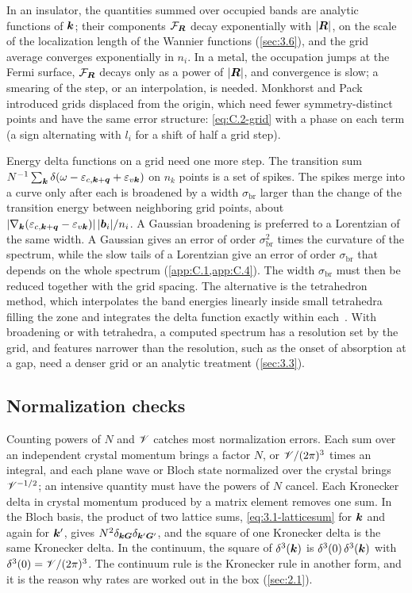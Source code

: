In an insulator, the quantities summed over occupied bands are analytic functions of $\bm{k}$; their components $\mathcal{F}_{\bm{R}}$ decay exponentially with $|\bm{R}|$, on the scale of the localization length of the Wannier functions (\cref{sec:3.6}), and the grid average converges exponentially in $n_i$. In a metal, the occupation jumps at the Fermi surface, $\mathcal{F}_{\bm{R}}$ decays only as a power of $|\bm{R}|$, and convergence is slow; a smearing of the step, or an interpolation, is needed. Monkhorst and Pack~\cite{monkhorst1976special} introduced grids displaced from the origin, which need fewer symmetry-distinct points and have the same error structure: \cref{eq:C.2-grid} with a phase on each term (a sign alternating with $l_i$ for a shift of half a grid step).

Energy delta functions on a grid need one more step. The transition sum $N^{-1}\sum_{\bm{k}}\delta(\omega - \varepsilon_{c,\bm{k}+\bm{q}} + \varepsilon_{v\bm{k}})$ on $n_k$ points is a set of spikes. The spikes merge into a curve only after each is broadened by a width $\sigma_{\mathrm{br}}$ larger than the change of the transition energy between neighboring grid points, about $|\nabla_{\bm{k}}(\varepsilon_{c,\bm{k}+\bm{q}} - \varepsilon_{v\bm{k}})|\,|\bm{b}_i|/n_i$. A Gaussian broadening is preferred to a Lorentzian of the same width. A Gaussian gives an error of order $\sigma_{\mathrm{br}}^2$ times the curvature of the spectrum, while the slow tails of a Lorentzian give an error of order $\sigma_{\mathrm{br}}$ that depends on the whole spectrum (\cref{app:C.1,app:C.4}). The width $\sigma_{\mathrm{br}}$ must then be reduced together with the grid spacing. The alternative is the tetrahedron method, which interpolates the band energies linearly inside small tetrahedra filling the zone and integrates the delta function exactly within each~\cite{blochl1994improved}. With broadening or with tetrahedra, a computed spectrum has a resolution set by the grid, and features narrower than the resolution, such as the onset of absorption at a gap, need a denser grid or an analytic treatment (\cref{sec:3.3}).

\subsection{Normalization checks}

Counting powers of $N$ and $\mathscr{V}$ catches most normalization errors. Each sum over an independent crystal momentum brings a factor $N$, or $\mathscr{V}/(2\pi)^3$ times an integral, and each plane wave or Bloch state normalized over the crystal brings $\mathscr{V}^{-1/2}$; an intensive quantity must have the powers of $N$ cancel. Each Kronecker delta in crystal momentum produced by a matrix element removes one sum. In the Bloch basis, the product of two lattice sums, \cref{eq:3.1-latticesum} for $\bm{k}$ and again for $\bm{k}'$, gives $N^2\delta_{\bm{k}\bm{G}}\delta_{\bm{k}'\bm{G}'}$, and the square of one Kronecker delta is the same Kronecker delta. In the continuum, the square of $\delta^3(\bm{k})$ is $\delta^3(0)\,\delta^3(\bm{k})$ with $\delta^3(0) = \mathscr{V}/(2\pi)^3$. The continuum rule is the Kronecker rule in another form, and it is the reason why rates are worked out in the box (\cref{sec:2.1}).
